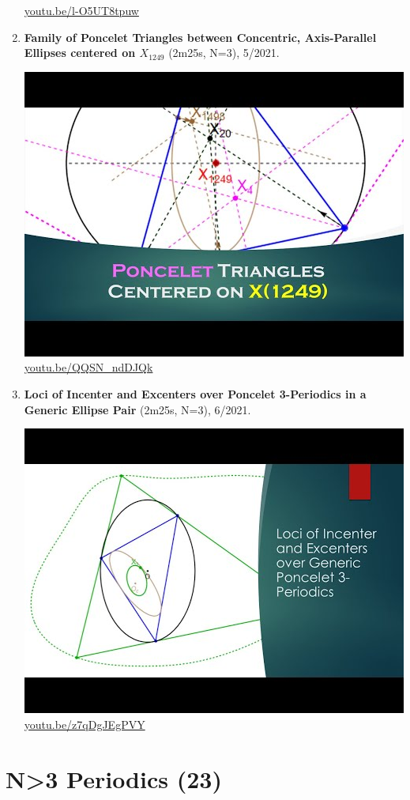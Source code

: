 \documentclass[12pt]{amsart}
\begin{document}
\begin{enumerate}[resume]
\begin{center}
\href{https://youtu.be/l-O5UT8tpuw}{\url{youtu.be/l-O5UT8tpuw}}\end{center}
% 
\item \textbf{Family of Poncelet Triangles between Concentric, Axis-Parallel Ellipses centered on $X_{1249}$} (2m25s, N=3), 5/2021. 
\begin{center}\includegraphics[width=.5\textwidth]{pics/QQSN_ndDJQk.jpg} \\ 
\href{https://youtu.be/QQSN_ndDJQk}{\url{youtu.be/QQSN\_ndDJQk}}\end{center}
% 
\item \textbf{Loci of Incenter and Excenters over Poncelet 3-Periodics in a Generic Ellipse Pair} (2m25s, N=3), 6/2021. 
\begin{center}\includegraphics[width=.5\textwidth]{pics/z7qDgJEgPVY.jpg} \\ 
\href{https://youtu.be/z7qDgJEgPVY}{\url{youtu.be/z7qDgJEgPVY}}\end{center}
% 
\end{enumerate}

\section{N>3 Periodics (23)}
\end{document}
